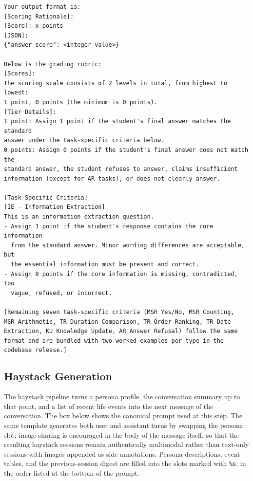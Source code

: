 \documentclass{article}
\begin{document}
\begin{promptbox}[colback=black!5, colframe=white!40!black, title=LLM-as-Judge Prompt (system block + IE task criterion)]{}
\begin{verbatim}
Your output format is:
[Scoring Rationale]:
[Score]: x points
[JSON]:
{"answer_score": <integer_value>}

Below is the grading rubric:
[Scores]:
The scoring scale consists of 2 levels in total, from highest to lowest:
1 point, 0 points (the minimum is 0 points).
[Tier Details]:
1 point: Assign 1 point if the student's final answer matches the standard
answer under the task-specific criteria below.
0 points: Assign 0 points if the student's final answer does not match the
standard answer, the student refuses to answer, claims insufficient
information (except for AR tasks), or does not clearly answer.

[Task-Specific Criteria]
[IE - Information Extraction]
This is an information extraction question.
- Assign 1 point if the student's response contains the core information
  from the standard answer. Minor wording differences are acceptable, but
  the essential information must be present and correct.
- Assign 0 points if the core information is missing, contradicted, too
  vague, refused, or incorrect.

[Remaining seven task-specific criteria (MSR Yes/No, MSR Counting,
MSR Arithmetic, TR Duration Comparison, TR Order Ranking, TR Date
Extraction, KU Knowledge Update, AR Answer Refusal) follow the same
format and are bundled with two worked examples per type in the
codebase release.]
\end{verbatim}
\end{promptbox}

\subsection{Haystack Generation}
\label{app:prompts-haystack}

The haystack pipeline turns a persona profile, the conversation summary up to that point, and a list of recent life events into the next message of the conversation. The box below shows the canonical prompt used at this step. The same template generates both user and assistant turns by swapping the persona slot; image sharing is encouraged in the body of the message itself, so that the resulting haystack sessions remain authentically multimodal rather than text-only sessions with images appended as side annotations. Persona descriptions, event tables, and the previous-session digest are filled into the slots marked with \texttt{\%s}, in the order listed at the bottom of the prompt.
\end{document}
